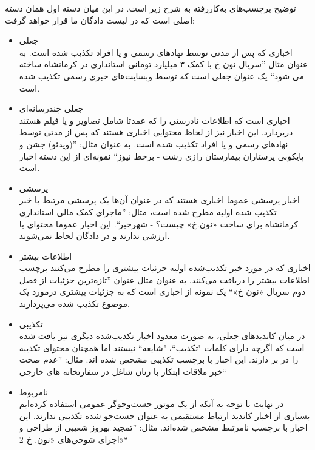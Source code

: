 توضیح برچسب‌های به‌کاررفته به شرح زیر است. در این میان دسته اول همان دسته اصلی است که در لیست دادگان ما قرار خواهد گرفت:
\begin{itemize}
\item جعلی \\
اخباری که پس از مدتی توسط نهاد‌های رسمی و یا افراد تکذیب شده است. به عنوان مثال ''سریال نون خ با کمک ۳ میلیارد تومانی استانداری در کرمانشاه ساخته می شود`` یک عنوان جعلی است که توسط وبسایت‌های خبری رسمی تکذیب شده است.

\item جعلی چندرسانه‌ای \\
اخباری است که اطلاعات نادرستی را که عمدتا شامل تصاویر و یا فیلم هستند دربردارد. 
این اخبار نیز از لحاظ محتوایی اخباری هستند که پس از مدتی توسط نهاد‌های رسمی و یا افراد تکذیب شده است.
به عنوان مثال: ''(ویدئو) جشن و پایکوبی پرستاران بیمارستان رازی رشت - برخط نیوز`` نمونه‌ای از این دسته اخبار است.

\item پرسشی \\
اخبار پرسشی عموما اخباری هستند که در عنوان‌ آن‌ها یک پرسشی مرتبط با خبر تکذیب شده اولیه مطرح شده است، مثال: ''ماجرای کمک مالی استانداری کرمانشاه برای ساخت «نون‌.خ» چیست؟ - شهرخبر``. این اخبار عموما محتوای با ارزشی ندارند و در دادگان لحاظ نمی‌شوند.

\item اطلاعات بیشتر \\
اخباری که در مورد خبر تکذیب‌شده اولیه جزئیات بیشتری را مطرح می‌کنند برچسب اطلاعات بیشتر را دریافت می‌کنند. به عنوان مثال عنوان ''تازه‌ترین جزئیات از فصل دوم سریال «نون خ»`` یک نمونه از اخباری است که به جزئیات بیشتری درمورد یک موضوع تکذیب شده می‌پردازند.
\item تکذیبی \\
در میان کاندید‌های جعلی، به صورت معدود اخبار تکذیب‌شده دیگری نیز یافت شده است که اگرچه دارای کلمات "تکذیب``، "شایعه`` نیستند اما همچنان محتوای تکذیبه را در بر دارند. این اخبار با برچسب تکذیبی مشخص شده اند. مثال: ''عدم صحت خبر ملاقات ابتكار با زنان شاغل در سفارتخانه های خارجی``

\item نامربوط \\
در نهایت با توجه به آنکه از یک موتور جست‌و‌جوگر عمومی استفاده کرده‌ایم بسیاری از اخبار کاندید ارتباط مستقیمی به عنوان جست‌جو شده تکذیبی ندارند. این اخبار با برچسب نامرتبط مشخص شده‌اند. مثال: ''تمجید بهروز شعیبی از طراحی و اجرای شوخی‌های «نون. خ 2»``

\end{itemize}


